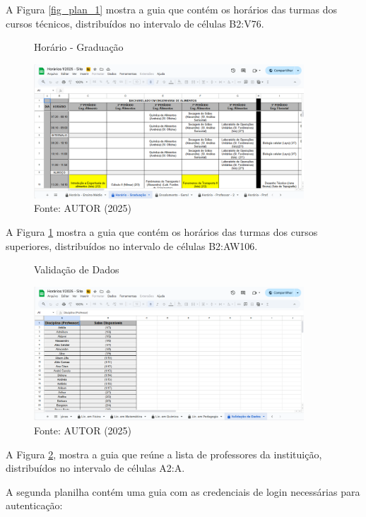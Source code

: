 A Figura \ref{fig_plan_1} mostra a guia que contém os horários das turmas dos cursos técnicos, distribuídos no intervalo de células B2:V76.

\begin{figure}[htb]
    \centering
    \caption{Horário - Graduação}
    \includegraphics[width=0.9\textwidth]{Figuras/plan-2.png}
    \caption*{Fonte: AUTOR (2025)}
    \label{fig_plan_2}
\end{figure}

A Figura \ref{fig_plan_2} mostra a guia que contém os horários das turmas dos cursos superiores, distribuídos no intervalo de células B2:AW106.

\begin{figure}[H]
    \centering
    \caption{Validação de Dados}
    \includegraphics[width=0.9\textwidth]{Figuras/plan-3.png}
    \caption*{Fonte: AUTOR (2025)}
    \label{fig_plan_3}
\end{figure}

A Figura \ref{fig_plan_3}, mostra a guia que reúne a lista de professores da instituição, distribuídos no intervalo de células A2:A.

A segunda planilha contém uma guia com as credenciais de login necessárias para autenticação:

